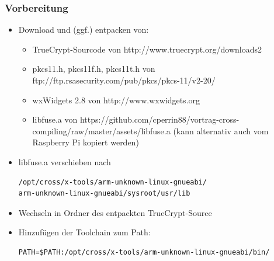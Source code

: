 \documentclass{beamer}
\begin{document}
\begin{frame}[fragile]
\frametitle{Vorbereitung}
\begin{itemize}
\item Download und (ggf.) entpacken von:
\begin{itemize}
\item TrueCrypt-Sourcode von http://www.truecrypt.org/downloads2
\item pkcs11.h, pkcs11f.h, pkcs11t.h von ftp://ftp.rsasecurity.com/pub/pkcs/pkcs-11/v2-20/
\item wxWidgets 2.8 von http://www.wxwidgets.org
\item libfuse.a von https://github.com/cperrin88/vortrag-cross-compiling/raw/master/assets/libfuse.a (kann alternativ auch vom Raspberry Pi kopiert werden)
\end{itemize}
\item libfuse.a verschieben nach
\begin{footnotesize}
\begin{verbatim}
/opt/cross/x-tools/arm-unknown-linux-gnueabi/
arm-unknown-linux-gnueabi/sysroot/usr/lib
\end{verbatim}
\end{footnotesize}
\item Wechseln in Ordner des entpackten TrueCrypt-Source
\item Hinzufügen der Toolchain zum Path: 
\begin{footnotesize}
\begin{verbatim}
PATH=$PATH:/opt/cross/x-tools/arm-unknown-linux-gnueabi/bin/
\end{verbatim}
\end{footnotesize}
\end{itemize}
\end{frame}
\end{document}
